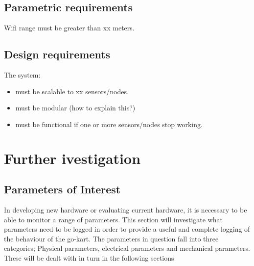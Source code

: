 \subsection{Parametric requirements}
Wifi range must be greater than xx meters.

\subsection{Design requirements}
The system:
\begin{itemize}
\item must be scalable to xx sensors/nodes.
\item must be modular (how to explain this?)
\item must be functional if one or more sensors/nodes stop working.	 
\end{itemize}
\newpage
\section{Further ivestigation}

\subsection{Parameters of Interest}
In developing new hardware or evaluating current hardware, it is necessary to be able to monitor a range of parameters.
This section will investigate what parameters need to be logged in order to provide a useful and complete logging of the behaviour of the go-kart.
The parameters in question fall into three categories; Physical parameters, electrical parameters and mechanical parameters.
These will be dealt with in turn in the following sections
